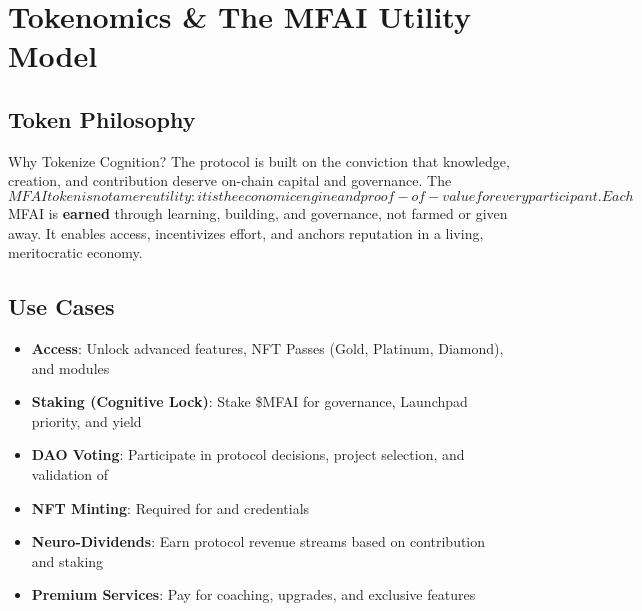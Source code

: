 \section{Tokenomics \& The MFAI Utility Model}

\subsection{Token Philosophy}

\begin{mfai-box}{Why Tokenize Cognition?}{}
The  protocol is built on the conviction that knowledge, creation, and contribution deserve on-chain capital and governance. The $MFAI token is not a mere utility: it is the economic engine and proof-of-value for every participant. Each $MFAI is \textbf{earned} through learning, building, and governance, not farmed or given away. It enables access, incentivizes effort, and anchors reputation in a living, meritocratic economy.
\end{mfai-box}

\subsection{Use Cases}
\begin{itemize}
    \item \faKey\quad \textbf{Access}: Unlock advanced features, NFT Passes (Gold, Platinum, Diamond), and  modules
    \item \faLock\quad \textbf{Staking (Cognitive Lock\texttrademark)}: Stake \$MFAI for governance, Launchpad priority, and yield
    \item \faGavel\quad \textbf{DAO Voting}: Participate in protocol decisions, project selection, and validation of 
    \item \faCertificate\quad \textbf{NFT Minting}: Required for  and  credentials
    \item \faChartLine\quad \textbf{Neuro-Dividends\texttrademark}: Earn protocol revenue streams based on contribution and staking
    \item \faRocket\quad \textbf{Premium Services}: Pay for coaching, upgrades, and exclusive features
\end{itemize}

